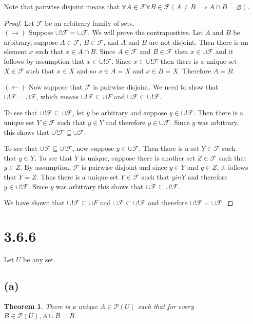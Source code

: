 \documentclass{article}
\newcommand{\F}{\mathcal{F}}
\newcommand{\pwset}{\mathscr{P}}
\newtheorem*{theorem}{Theorem}  %
\begin{document}
\begin{flushleft} Note that pairwise disjoint means that $\forall A \in \F \forall B \in \F (A \neq B \implies A \cap B = \varnothing)$.
\end{flushleft}

\begin{proof} Let $\F$ be an arbitrary family of sets. \\
$(\rightarrow)$ Suppose $\cup! \F = \cup \F$. We will prove the contrapositive. Let $A$ and $B$ be arbitrary, suppose $A \in \F$, $B \in \F$, and $A$ and $B$ are not disjoint. Then there is an element $x$ such that $x \in A \cap B$. Since $A \in \F$ and $B \in \F$ then $x \in \cup \F$ and it follows by assumption that $x \in \cup! \F$. Since $x \in \cup! \F$ then there is a unique set $X \in \F$ such that $x \in X$ and so $x \in A = X$ and $x \in B = X$. Therefore $A = B$.

$(\leftarrow)$ Now suppose that $\F$ is pairwise disjoint. We need to show that $\cup! \F = \cup \F$, which means $\cup! \F \subseteq \cup F$ and $\cup \F \subseteq \cup ! \F$. 

To see that $\cup! \F \subseteq \cup \F$, let $y$ be arbitrary and suppose $y \in \cup! \F$. Then there is a unique set $Y \in \F$ such that $y \in Y$ and therefore $y \in \cup \F$. Since $y$ was arbitrary, this shows that $\cup! \F \subseteq \cup \F$.

To see that $\cup \F \subseteq \cup! \F$, now suppose $y \in \cup \F$. Then there is a set $Y \in \F$ such that $y \in Y$. To see that $Y$ is unique, suppose there is another set $Z \in \F$ such that $y \in Z$. By assumption, $\F$ is pairwise disjoint and since $y \in Y$ and $y \in Z$, it follows that $Y = Z$. Thus there is a unique set $Y \in \F$ such that $y in Y$ and therefore $y \in \cup! \F$. Since $y$ was arbitrary this shows that $\cup \F \subseteq \cup! \F$.

We have shown that $\cup! \F \subseteq \cup F$ and $\cup \F \subseteq \cup ! \F$ and therefore $\cup! \F = \cup \F$.
\end{proof}

\section*{3.6.6}
Let $U$ be any set.

\subsection*{(a)}
\begin{theorem} There is a unique $A \in \pwset(U)$ such that for every $B \in \pwset(U), A \cup B = B$.
\end{theorem}
\end{document}
